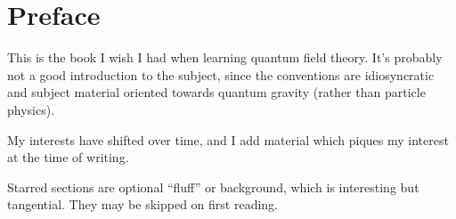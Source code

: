 \chapter*{Preface}

\M
This is the book I wish I had when learning quantum field theory.
It's probably not a good introduction to the subject, since the
conventions are idiosyncratic and subject material oriented towards
quantum gravity (rather than particle physics).

My interests have shifted over time, and I add material which piques my
interest at the time of writing.

Starred sections are optional ``fluff'' or background, which is
interesting but tangential. They may be skipped on first reading.
